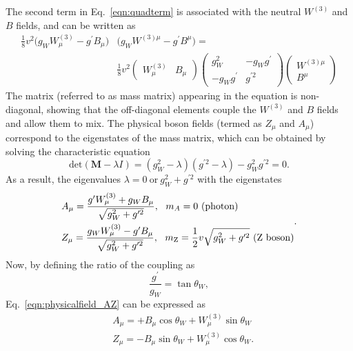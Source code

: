 The second term in Eq.~\ref{eqn:quadterm} is associated with the neutral $W^{(3)}$ and $B$ fields, and can be written as
\begin{equation}
\label{eqn:quadterm_neutral}
\begin{split}
\frac{1}{8}v^{2}\bigg(g_{W}W_{\mu}^{(3)}-g^{\prime}B_{\mu}\bigg)&\bigg(g_{W}W^{(3)\mu}-g^{\prime}B^{\mu}\bigg) = \\
& \frac{1}{8}v^{2}\begin{pmatrix}
  W_{\mu}^{(3)} & B_{\mu}
 \end{pmatrix}
 \begin{pmatrix}
  g_{W}^{2} & -g_{W}g^{\prime} \\
  -g_{W}g^{\prime} & g^{\prime 2}
 \end{pmatrix}
 \begin{pmatrix}
  W^{(3)\mu} \\
  B^{\mu}
 \end{pmatrix}
\end{split}
\end{equation}
The matrix (referred to as mass matrix) appearing in the equation is non-diagonal, showing that the off-diagonal elements couple the $W^{(3)}$ and $B$ fields and allow them to mix.
The physical boson fields (termed as $Z_{\mu}$ and $A_{\mu}$) correspond to the eigenstates of the mass matrix, which can be obtained by solving the characteristic equation 
\begin{equation}
\text{det}(\boldsymbol{M}-\lambda I) = (g_{W}^{2}-\lambda)(g^{\prime 2}-\lambda)-g_{W}^{2}g^{\prime 2} = 0.
\end{equation}
As a result, the eigenvalues $\lambda = 0\ \text{or}\ g_{W}^{2}+g^{\prime 2}$ with the eigenstates
\begin{equation}
\label{eqn:physicalfield_AZ}
\begin{split}
& A_{\mu} = \frac{g^{\prime}W_{\mu}^{(3)}+g_{W}B_{\mu}}{\sqrt{g_{W}^{2}+g^{\prime 2}}} ,\ \ m_{A}=0\ (\text{photon}) \\
& Z_{\mu} = \frac{g_{W}W_{\mu}^{(3)}-g^{\prime}B_{\mu}}{\sqrt{g_{W}^{2}+g^{\prime 2}}} ,\ \ m_{\cPZ}=\frac{1}{2}v\sqrt{g_{W}^{2}+g^{\prime 2}}\ (\cPZ\ \text{boson})
\end{split}
.
\end{equation}
Now, by defining the ratio of the coupling as
\begin{equation}
\label{eqn:tanthetaW}
\frac{g^{\prime}}{g_{W}}=\tan\theta	_{W},
\end{equation}
Eq.~\ref{eqn:physicalfield_AZ} can be expressed as
\begin{equation*}
\begin{split}
& A_{\mu}=+B_{\mu}\cos\theta_{W} + W_{\mu}^{(3)}\sin\theta_{W} \\
& Z_{\mu}=-B_{\mu}\sin\theta_{W} + W_{\mu}^{(3)}\cos\theta_{W}.
\end{split}
\end{equation*}
